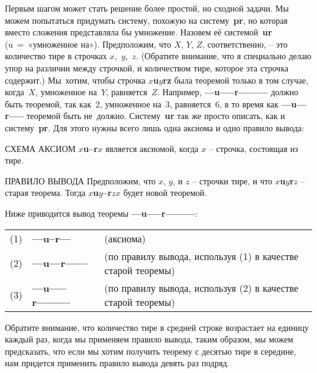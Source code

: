 \documentclass[../main.tex]{subfiles}
\begin{document}
Первым шагом может стать решение более простой, но сходной задачи. Мы можем попытаться придумать систему, похожую на систему~\textbf{pr}, но которая вместо сложения представляла бы умножение. Назовем её системой~\textbf{ur} (u~=~«умноженное на»). Предположим, что $X$, $Y$, $Z$, соответственно, \--- это количество тире в строчках $x$,~$y$,~$z$. (Обратите внимание, что я специально делаю упор на различии между строчкой, и количеством тире, которое эта строчка содержит.) Мы~хотим, чтобы строчка \textbf{$x$u$y$rz} была теоремой только в том случае, когда~$X$, умноженное на~$Y$, равняется~$Z$. Например, \textbf{--{}--u--{}--{}--r--{}--{}--{}--{}--{}--} должно быть теоремой, так как~2, умноженное на~3, равняется~6, в то время как \textbf{--{}--u--{}--r--{}--{}--} теоремой быть не~должно. Систему~\textbf{ur} так же просто описать, как и систему~\textbf{pr}. Для этого нужны всего лишь одна аксиома и одно правило вывода:

\begin{mybox}{СХЕМА АКСИОМ}
    \textbf{$x$u--r$x$} является аксиомой, когда $x$ \--- строчка, состоящая из тире.
\end{mybox}

\begin{mybox}{ПРАВИЛО ВЫВОДА}
    Предположим, что $x$, $y$, и $z$ \--- строчки тире, и что \textbf{$x$u$y$r$z$} \--- старая теорема.
    Тогда \textbf{$x$u$y$--r$zx$} будет новой теоремой.
\end{mybox}

Ниже приводится вывод теоремы \textbf{--{}--u--{}--{}--r--{}--{}--{}--{}--{}--}:
\begin{center}
\begin{tabular}{r @{~} l @{~~} l}
    (1) & \textbf{--{}--u--r--{}--}
        & (аксиома) \\
    (2) & \textbf{--{}--u--{}--r--{}--{}--{}--}
        & (по правилу вывода, используя (1) в качестве старой теоремы) \\
    (3) & \textbf{--{}--u--{}--{}--r--{}--{}--{}--{}--{}--}
        & (по правилу вывода, используя (2) в качестве старой теоремы) \\
\end{tabular}
\end{center}
Обратите внимание, что количество тире в средней строке возрастает на единицу каждый раз, когда мы применяем правило вывода, таким образом, мы можем предсказать, что если мы хотим получить теорему с десятью тире в середине, нам придется применить правило вывода девять раз подряд.
\end{document}
